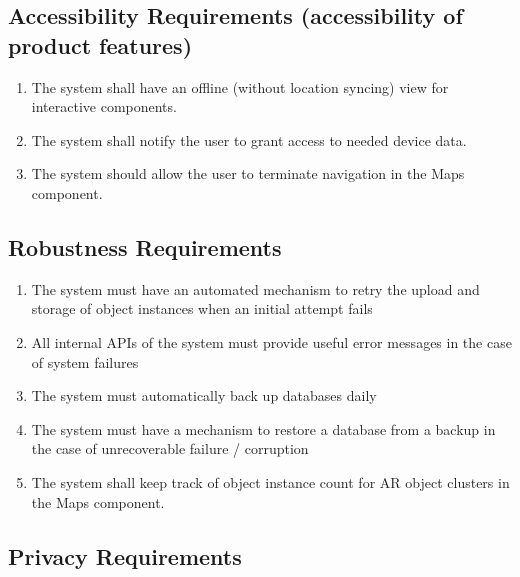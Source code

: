 \documentclass{article}
\begin{document}
\subsection{Accessibility Requirements (accessibility of product features)}

\begin{enumerate}[label=\textbf{ACR-\arabic*},ref=ACR-\arabic*]
    \item \label{ACR-1} The system shall have an offline (without location syncing) view for interactive components. \\
    \item \label{ACR-2} The system shall notify the user to grant access to needed device data. \\
    \item \label{ACR-3} The system should allow the user to terminate navigation in the Maps component. \\
\end{enumerate}

\subsection{Robustness Requirements}

\begin{enumerate}[label=\textbf{ROR-\arabic*},ref=ROR-\arabic*]
    \item \label{ROR-1} The system must have an automated mechanism to retry the upload and storage of object instances when an initial attempt fails \\
    \item \label{ROR-2} All internal APIs of the system must provide useful error messages in the case of system failures \\
    \item \label{ROR-3} The system must automatically back up databases daily \\
    \item \label{ROR-4} The system must have a mechanism to restore a database from a backup in the case of unrecoverable failure / corruption \\
    \item \label{ROR-5} The system shall keep track of object instance count for AR object clusters in the Maps component. \\
\end{enumerate}

\subsection{Privacy Requirements}
\end{document}
